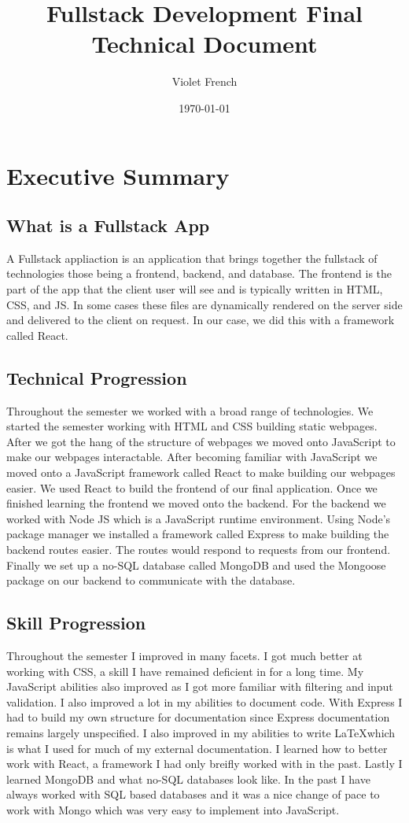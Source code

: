 \documentclass{article}[12pt]
\author{Violet French}
\title{Fullstack Development Final Technical Document}
\date{\today}
\begin{document}
    \maketitle
    \newpage
    \tableofcontents

    \section{Executive Summary}
    \subsection{What is a Fullstack App}
    A Fullstack appliaction is an application that brings together the fullstack of technologies those being a frontend, backend, and database. The frontend is the part of the app that the client user will see and is typically written in HTML, CSS, and JS. In some cases these files are dynamically rendered on the server side and delivered to the client on request. In our case, we did this with a framework called React.
    
    \subsection{Technical Progression}
    Throughout the semester we worked with a broad range of technologies. We started the semester working with HTML and CSS building static webpages. After we got the hang of the structure of webpages we moved onto JavaScript to make our webpages interactable. After becoming familiar with JavaScript we moved onto a JavaScript framework called React to make building our webpages easier. We used React to build the frontend of our final application. Once we finished learning the frontend we moved onto the backend. For the backend we worked with Node JS which is a JavaScript runtime environment. Using Node's package manager we installed a framework called Express to make building the backend routes easier. The routes would respond to requests from our frontend. Finally we set up a no-SQL database called MongoDB and used the Mongoose package on our backend to communicate with the database. 
    
    \subsection{Skill Progression}
    Throughout the semester I improved in many facets. I got much better at working with CSS, a skill I have remained deficient in for a long time. My JavaScript abilities also improved as I got more familiar with filtering and input validation. I also improved a lot in my abilities to document code. With Express I had to build my own structure for documentation since Express documentation remains largely unspecified. I also improved in my abilities to write \LaTeX which is what I used for much of my external documentation. I learned how to better work with React, a framework I had only breifly worked with in the past. Lastly I learned MongoDB and what no-SQL databases look like. In the past I have always worked with SQL based databases and it was a nice change of pace to work with Mongo which was very easy to implement into JavaScript.
\end{document}
